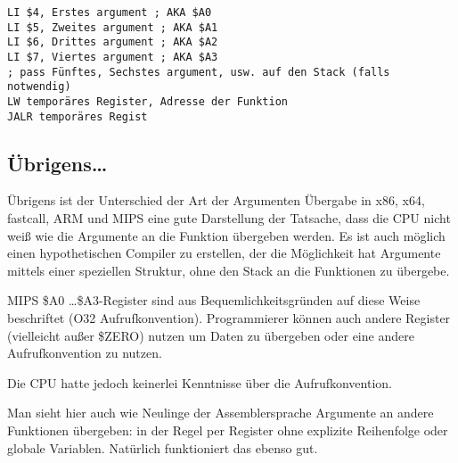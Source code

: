 \begin{lstlisting}[caption=MIPS (O32 calling convention)]
LI $4, Erstes argument ; AKA $A0
LI $5, Zweites argument ; AKA $A1
LI $6, Drittes argument ; AKA $A2
LI $7, Viertes argument ; AKA $A3
; pass Fünftes, Sechstes argument, usw. auf den Stack (falls notwendig)
LW temporäres Register, Adresse der Funktion
JALR temporäres Regist
\end{lstlisting}

\subsection{Übrigens\dots{}}

Übrigens ist der Unterschied der Art der Argumenten Übergabe in x86, x64, fastcall, ARM und MIPS eine gute
Darstellung der Tatsache, dass die CPU nicht weiß wie die Argumente an die Funktion übergeben werden.
Es ist auch möglich einen hypothetischen Compiler zu erstellen, der die Möglichkeit hat Argumente mittels
einer speziellen Struktur, ohne den Stack an die Funktionen zu übergebe.

MIPS \$A0 \dots \$A3-Register sind aus Bequemlichkeitsgründen auf diese Weise beschriftet (O32 Aufrufkonvention).
Programmierer können auch andere Register (vielleicht außer \$ZERO) nutzen um Daten zu übergeben
oder eine andere Aufrufkonvention zu nutzen.

Die \ac{CPU} hatte jedoch keinerlei Kenntnisse über die Aufrufkonvention.

Man sieht hier auch wie Neulinge der Assemblersprache Argumente an andere Funktionen übergeben:
in der Regel per Register ohne explizite Reihenfolge oder globale Variablen.
Natürlich funktioniert das ebenso gut.
